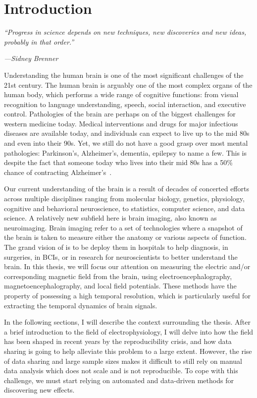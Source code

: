 \chapter{Introduction}
\pagestyle{mainmatter}

\epigraph{\small\itshape ``Progress in science depends on new techniques, new discoveries and new ideas, probably in that order.''}{\small\textit{---Sidney Brenner}}

Understanding the human brain is one of the most significant challenges of the 21st century. The human brain is arguably one of the most complex  organs of the human body, which performs a wide range of cognitive functions: from visual recognition to language understanding, speech, social interaction, and executive control. Pathologies of the brain are perhaps on of the biggest challenges for western medicine today. Medical interventions and drugs for major infectious diseases are available today, and individuals can expect to live up to the mid 80s and even into their 90s. Yet, we still do not have a good grasp over most mental pathologies: Parkinson's, Alzheimer's, dementia, epilepsy to name a few. This is despite the fact that someone today who lives into their mid 80s has a 50\% chance of contracting Alzheimer's~\citep{alzheimer20162016}.

Our current understanding of the brain is a result of decades of concerted efforts across multiple disciplines ranging from molecular biology, genetics, physiology, cognitive and behavioral neuroscience, to statistics, computer science, and data science. A relatively new subfield here is brain imaging, also known as neuroimaging. Brain imaging refer to a set of technologies where a snapshot of the brain is taken to measure either the anatomy or various aspects of function. The grand vision of is to be deploy them in hospitals to help diagnosis, in surgeries, in \acp{BCI}, or in research for neuroscientists to better understand the brain. In this thesis, we will focus our attention on measuring the electric and/or corresponding magnetic field from the brain, using electroencephalography, magnetoencephalography, and local field potentials. These methods have the property of possessing a high temporal resolution, which is particularly useful for extracting the temporal dynamics of brain signals.

In the following sections, I will describe the context surrounding the thesis. After a brief introduction to the field of electrophysiology, I will delve into how the field has been shaped in recent years by the reproducibility crisis, and how data sharing is going to help alleviate this problem to a large extent. However, the rise of data sharing and large sample sizes makes it difficult to still rely on manual data analysis which does not scale and is not reproducible. To cope with this challenge, we must start relying on automated and data-driven methods for discovering new effects.
 
